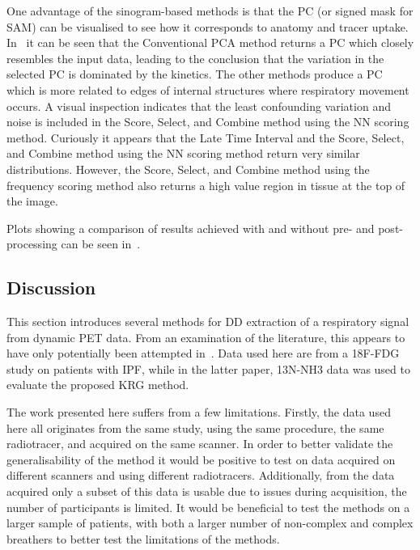             One advantage of the sinogram-based methods is that the \gls{PC} (or signed mask for \gls{SAM}) can be visualised to see how it corresponds to anatomy and tracer uptake. In~ it can be seen that the Conventional \gls{PCA} method returns a \gls{PC} which closely resembles the input data, leading to the conclusion that the variation in the selected \gls{PC} is dominated by the kinetics. The other methods produce a \gls{PC} which is more related to edges of internal structures where respiratory movement occurs. A visual inspection indicates that the least confounding variation and noise is included in the Score, Select, and Combine method using the \gls{NN} scoring method. Curiously it appears that the Late Time Interval and the Score, Select, and Combine method using the \gls{NN} scoring method return very similar distributions. However, the Score, Select, and Combine method using the frequency scoring method also returns a high value region in tissue at the top of the image.

            Plots showing a comparison of results achieved with and without pre- and post-processing can be seen in~.

        \subsection{Discussion} \label{sec:pca_data_driven_surrogate_signal_extraction_methods_for_dynamic_pet_discussion}
            This section introduces several methods for \gls{DD} extraction of a respiratory signal from dynamic \gls{PET} data. From an examination of the literature, this appears to have only potentially been attempted in~\parencite{Schleyer2014}. Data used here are from a \gls{18F-FDG} study on patients with \gls{IPF}, while in the latter paper, \gls{13N-NH3} data was used to evaluate the proposed \gls{KRG} method.
            
            The work presented here suffers from a few limitations. Firstly, the data used here all originates from the same study, using the same procedure, the same radiotracer, and acquired on the same scanner. In order to better validate the generalisability of the method it would be positive to test on data acquired on different scanners and using different radiotracers. Additionally, from the data acquired only a subset of this data is usable due to issues during acquisition, the number of participants is limited. It would be beneficial to test the methods on a larger sample of patients, with both a larger number of non-complex and complex breathers to better test the limitations of the methods.
            
